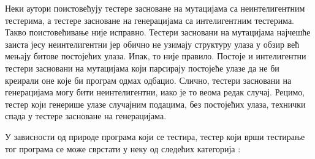 \documentclass[12pt,oneside]{memoir}
\begin{document}
Неки аутори поистовећују тестере засноване на мутацијама са неинтелигентним тестерима, а тестере засноване на генерацијама са интелигентним тестерима. Такво поистовећивање није исправно. Тестери засновани на мутацијама најчешће заиста јесу неинтелигентни јер обично не узимају структуру улаза у обзир 
већ мењају битове постојећих улаза. Ипак, то није правило. Постоје и интелигентни тестери засновани на мутацијама који парсирају постојеће улазе да не би креирали оне које би програм одмах одбацио.
Слично, тестери засновани на генерацијама могу бити неинтелигентни, иако је то веома редак случај. Рецимо, тестер који генерише улазе случајним подацима, без постојећих улаза, технички спада у тестере засноване на генерацијама. 


У зависности од природе програма који се тестира, тестер који врши тестирање тог програма се може сврстати у неку од следећих категорија \cite{fuzzingBrute, fuzzing}:
\end{document}

